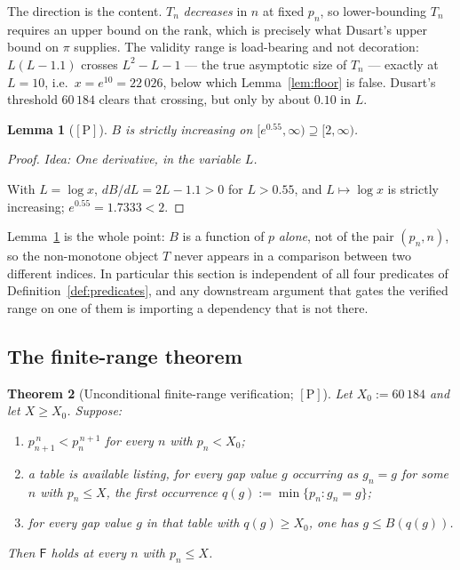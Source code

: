\documentclass[11pt,a4paper]{article}
\theoremstyle{plain}
\newtheorem{theorem}{Theorem}[section]
\newtheorem{lemma}[theorem]{Lemma}
\theoremstyle{definition}
\theoremstyle{remark}
\newcommand{\idea}[1]{\emph{Idea: #1}\par\smallskip}
\newcommand{\cP}{{[\mathrm{P}]}}
\newcommand{\Fb}{\mathsf{F}}
\begin{document}
The direction is the content. $T_n$ \emph{decreases} in $n$ at fixed $p_n$, so lower-bounding
$T_n$ requires an upper bound on the rank, which is precisely what Dusart's upper bound on
$\pi$ supplies. The validity range is load-bearing and not decoration: $L(L-1.1)$ crosses
$L^2 - L - 1$ --- the true asymptotic size of $T_n$ --- exactly at $L = 10$, i.e.\
$x = e^{10} = 22\,026$, below which Lemma~\ref{lem:floor} is false. Dusart's threshold
$60\,184$ clears that crossing, but only by about $0.10$ in $L$.

\begin{lemma}[$\cP$]
\label{lem:Bmono}
$B$ is strictly increasing on $[e^{0.55},\infty) \supseteq [2,\infty)$.
\end{lemma}

\begin{proof}
\idea{One derivative, in the variable $L$.}
With $L = \log x$, $dB/dL = 2L - 1.1 > 0$ for $L > 0.55$, and $L \mapsto \log x$ is strictly
increasing; $e^{0.55} = 1.7333 < 2$.
\end{proof}

Lemma~\ref{lem:Bmono} is the whole point: $B$ is a function of $p$ \emph{alone}, not of the
pair $(p_n, n)$, so the non-monotone object $T$ never appears in a comparison between two
different indices. In particular this section is independent of all four predicates of
Definition~\ref{def:predicates}, and any downstream argument that gates the verified range on
one of them is importing a dependency that is not there.

\subsection{The finite-range theorem}

\begin{theorem}[Unconditional finite-range verification; $\cP$]
\label{thm:range}
Let $X_0 := 60\,184$ and let $X \ge X_0$. Suppose:
\begin{enumerate}
\item[\textup{(H1)}] $p_{n+1}^{\,n} < p_n^{\,n+1}$ for every $n$ with $p_n < X_0$;
\item[\textup{(H2)}] a table is available listing, for every gap value $g$ occurring as
  $g_n = g$ for some $n$ with $p_n \le X$, the first occurrence
  $q(g) := \min\{p_n : g_n = g\}$;
\item[\textup{(H3)}] for every gap value $g$ in that table with $q(g) \ge X_0$, one has
  $g \le B(q(g))$.
\end{enumerate}
Then $\Fb$ holds at every $n$ with $p_n \le X$.
\end{theorem}
\end{document}
